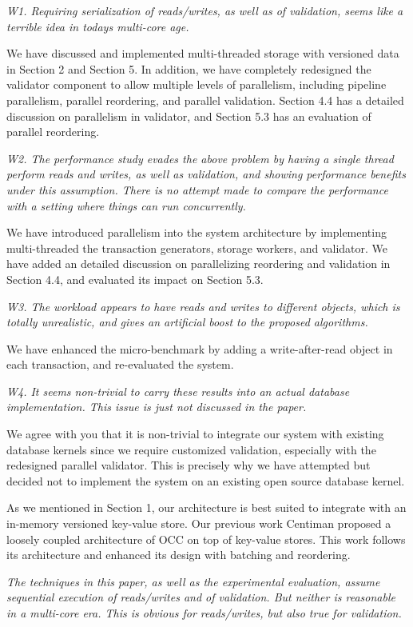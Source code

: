 \documentclass{article}
\begin{document}
\emph{W1. Requiring serialization of reads/writes, as well as of validation, seems like a terrible idea in todays multi-core age. }

We have discussed and implemented multi-threaded storage with versioned data in Section 2 and Section 5. In addition, we have completely redesigned the validator component to allow multiple levels of parallelism, including pipeline parallelism, parallel reordering, and parallel validation. Section 4.4 has a detailed discussion on parallelism in validator, and Section 5.3 has an evaluation of parallel reordering.

\emph{W2. The performance study evades the above problem by having a single thread perform reads and writes, as well as validation, and showing performance benefits under this assumption. There is no attempt made to compare the performance with a setting where things can run concurrently. }

We have introduced parallelism into the system architecture by implementing multi-threaded the transaction generators, storage workers, and validator. We have added an detailed discussion on parallelizing reordering and validation in Section 4.4, and evaluated its impact on Section 5.3.

\emph{W3. The workload appears to have reads and writes to different objects, which is totally unrealistic, and gives an artificial boost to the proposed algorithms.}

We have enhanced the micro-benchmark by adding a write-after-read object in each transaction, and re-evaluated the system.

\emph{W4. It seems non-trivial to carry these results into an actual database implementation. This issue is just not discussed in the paper.}

We agree with you that it is non-trivial to integrate our system with existing database kernels since we require customized validation, especially with the redesigned parallel validator. This is precisely why we have attempted but decided not to implement the system on an existing open source database kernel.

As we mentioned in Section 1, our architecture is best suited to integrate with an in-memory versioned key-value store. Our previous work Centiman proposed a loosely coupled architecture of OCC on top of key-value stores. This work follows its architecture and enhanced its design with batching and reordering.

\emph{The techniques in this paper, as well as the experimental evaluation, assume sequential execution of reads/writes and of validation. But neither is reasonable in a multi-core era. This is obvious for reads/writes, but also true for validation. 
}
\end{document}
